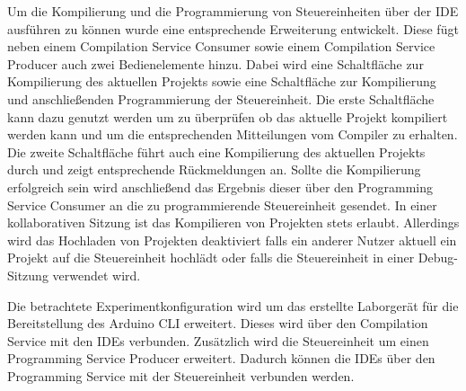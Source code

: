 Um die Kompilierung und die Programmierung von Steuereinheiten über der IDE ausführen zu können wurde eine entsprechende Erweiterung entwickelt. Diese fügt neben einem Compilation Service Consumer sowie einem Compilation Service Producer auch zwei Bedienelemente hinzu. Dabei wird eine Schaltfläche zur Kompilierung des aktuellen Projekts sowie eine Schaltfläche zur Kompilierung und anschließenden Programmierung der Steuereinheit. Die erste Schaltfläche kann dazu genutzt werden um zu überprüfen ob das aktuelle Projekt kompiliert werden kann und um die entsprechenden Mitteilungen vom Compiler zu erhalten. Die zweite Schaltfläche führt auch eine Kompilierung des aktuellen Projekts durch und zeigt entsprechende Rückmeldungen an. Sollte die Kompilierung erfolgreich sein wird anschließend das Ergebnis dieser über den Programming Service Consumer an die zu programmierende Steuereinheit gesendet. In einer kollaborativen Sitzung ist das Kompilieren von Projekten stets erlaubt. Allerdings wird das Hochladen von Projekten deaktiviert falls ein anderer Nutzer aktuell ein Projekt auf die Steuereinheit hochlädt oder falls die Steuereinheit in einer Debug-Sitzung verwendet wird.

Die betrachtete Experimentkonfiguration wird um das erstellte Laborgerät für die Bereitstellung des Arduino CLI erweitert. Dieses wird über den Compilation Service mit den IDEs verbunden. Zusätzlich wird die Steuereinheit um einen Programming Service Producer erweitert. Dadurch können die IDEs über den Programming Service mit der Steuereinheit verbunden werden.